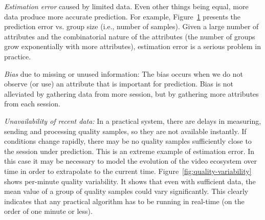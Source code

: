 \begin{packedenumerate}
  \item \emph{Estimation error} caused by limited data.  Even other things being equal, more data produce more accurate prediction. For example, Figure~\ref{fig:group-size-impact} presents the prediction error vs. group size (i.e., number of samples). Given a large number of attributes and the combinatorial nature of the attributes (the number of groups grow exponentially with more attributes), estimation error is a serious problem in practice. 


\begin{figure}[h!]
\centering
{}
\label{fig:group-size-impact}
\end{figure}

\item \emph{Bias} due to missing or unused information: The bias occurs when we do not observe (or use) an attribute that is important for prediction. Bias is not alleviated by gathering data from more session, but by gathering more attributes from each session.

\item \emph{Unavailability of recent data:} In a practical system, there are delays in measuring, sending and processing quality samples, so they are not available instantly.  If conditions change rapidly, there may be no quality samples sufficiently close to the session under prediction.  This is an extreme example of estimation error.  In this case it may be necessary to model the evolution of the video ecosystem over time in order to extrapolate to the current time. Figure~\ref{fig:quality-variability} shows per-minute quality variability. It shows that even with sufficient data, the mean value of a group of quality samples could vary significantly. This clearly indicates that any practical algorithm has to be running in real-time (on the order of one minute or less).


\end{packedenumerate}
